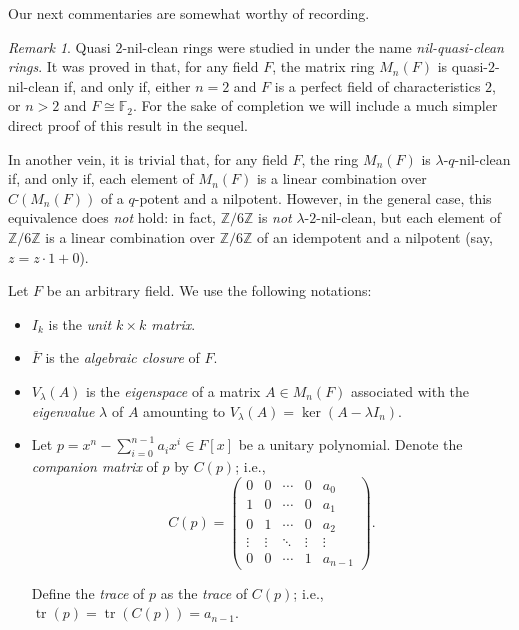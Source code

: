 \documentclass{amsart}
\DeclareMathOperator{\tr}{tr}
\theoremstyle{definition}
\theoremstyle{remark}
\newtheorem{remark}[theorem]{Remark}
\numberwithin{equation}{section}
\begin{document}
Our next commentaries are somewhat worthy of recording.

\begin{remark}
Quasi $2$-nil-clean rings were studied in \cite{Su} under the name {\it nil-quasi-clean rings}. It was proved in \cite[Theorem 2.3]{Su} that, for any field $F$, the matrix ring $M_{n}(F)$ is quasi-$2$-nil-clean if, and only if, either $n=2$ and $F$ is a perfect field of characteristics $2$, or $n > 2$ and $F \cong \mathbb{F}_{2}$. For the sake of completion we will include a much simpler direct proof of this result in the sequel.

In another vein, it is trivial that, for any field $F$, the ring $M_{n}(F)$ is $\lambda$-$q$-nil-clean if, and only if, each element of $M_{n}(F)$ is a linear combination over $C(M_{n}(F))$ of a $q$-potent and a nilpotent. However, in the general case, this equivalence does {\it not} hold: in fact, $\mathbb{Z}/6\mathbb{Z}$ is {\it not} $\lambda$-$2$-nil-clean, but each element of $\mathbb{Z}/6\mathbb{Z}$ is a linear combination over $\mathbb{Z}/6\mathbb{Z}$ of an idempotent and a nilpotent (say, $z = z \cdot 1 + 0$).
\end{remark}

Let $F$ be an arbitrary field. We use the following notations:

\begin{itemize}
\item $I_{k}$ is the {\it unit $k \times k$ matrix}.
\item $\overline{F}$ is the {\it algebraic closure} of $F$.
\item $V_{\lambda}(A)$ is the {\it eigenspace} of a matrix $A \in M_{n}(F)$ associated with the {\it eigenvalue} $\lambda$ of $A$ amounting to ${V_{\lambda} (A) = \ker(A-\lambda I_{n})}$.
\item Let $p = x^{n} - \sum\limits_{i=0}^{n-1}a_{i}x^{i} \in F[x]$ be a unitary polynomial. Denote the {\it companion matrix} of $p$ by $C(p)$; i.e.,
\[
  C(p) =
  \left(
  \begin{array}{ccccc}
  0 & 0 & \cdots & 0 & a_{0}
  \\
  1 & 0 & \cdots & 0 & a_{1}
  \\
  0 & 1 & \cdots & 0 & a_{2}
  \\
  \vdots & \vdots & \ddots & \vdots & \vdots
  \\
  0 & 0 & \cdots & 1 & a_{n-1}
  \end{array}
  \right).
\]

\medskip

\noindent Define the {\it trace} of $p$ as the {\it trace} of $C(p)$; i.e., $\tr(p) = \tr(C(p)) = a_{n-1}$.
\end{itemize}
\end{document}
